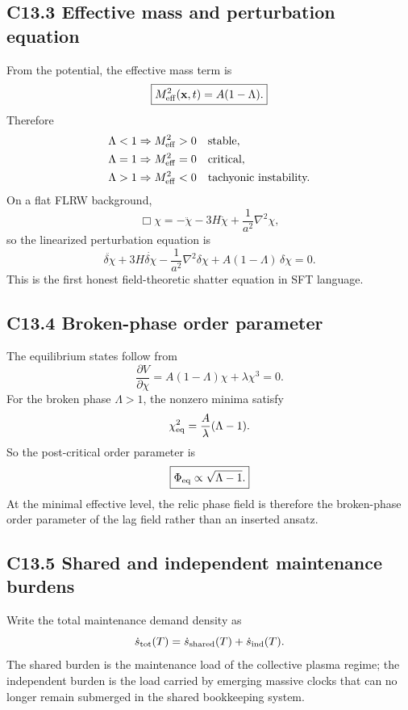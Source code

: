 \documentclass[11pt]{article}
\begin{document}
\subsection*{C13.3 Effective mass and perturbation equation}
From the potential, the effective mass term is
\begin{equation}
\boxed{M_{\rm eff}^2(\mathbf x,t)=A(1-\Lambda).}
\end{equation}
Therefore
\begin{align*}
\Lambda<1 &\Rightarrow M_{\rm eff}^2>0 \quad \text{stable},\\
\Lambda=1 &\Rightarrow M_{\rm eff}^2=0 \quad \text{critical},\\
\Lambda>1 &\Rightarrow M_{\rm eff}^2<0 \quad \text{tachyonic instability.}
\end{align*}
On a flat FLRW background,
\begin{equation}
\Box\chi=-\ddot\chi-3H\dot\chi+\frac{1}{a^2}\nabla^2\chi,
\end{equation}
so the linearized perturbation equation is
\begin{equation}
\boxed{\ddot{\delta\chi}+3H\dot{\delta\chi}-\frac{1}{a^2}\nabla^2\delta\chi + A(1-\Lambda)\,\delta\chi = 0.}
\end{equation}
This is the first honest field-theoretic shatter equation in SFT language.

\subsection*{C13.4 Broken-phase order parameter}
The equilibrium states follow from
\begin{equation}
\frac{\partial V}{\partial \chi}=A(1-\Lambda)\chi+\lambda\chi^3=0.
\end{equation}
For the broken phase $\Lambda>1$, the nonzero minima satisfy
\begin{equation}
\chi_{\rm eq}^2 = \frac{A}{\lambda}(\Lambda-1).
\end{equation}
So the post-critical order parameter is
\begin{equation}
\boxed{\Phi_{\rm eq}\propto \sqrt{\Lambda-1}.}
\end{equation}
At the minimal effective level, the relic phase field is therefore the broken-phase order parameter of the lag field rather than an inserted ansatz.

\subsection*{C13.5 Shared and independent maintenance burdens}
Write the total maintenance demand density as
\begin{equation}
\dot s_{\rm tot}(T)=\dot s_{\rm shared}(T)+\dot s_{\rm ind}(T).
\end{equation}
The shared burden is the maintenance load of the collective plasma regime; the independent burden is the load carried by emerging massive clocks that can no longer remain submerged in the shared bookkeeping system.
\end{document}
